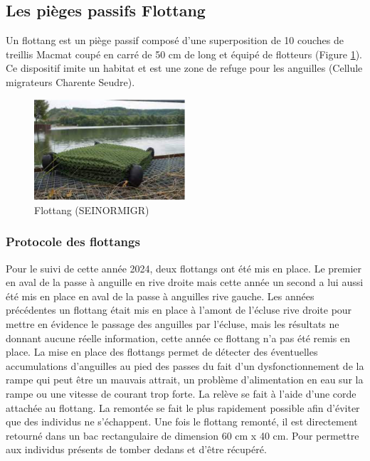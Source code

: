 \documentclass[11pt,titlepage,twoside]{article}\usepackage[]{graphicx}\usepackage[table]{xcolor}
\begin{document}
\subsection{Les pièges passifs \og Flottang \fg{}}

Un flottang est un piège passif composé d’une superposition de 10 couches de treillis Macmat coupé en carré de 50 cm de long et équipé de flotteurs (Figure \ref{Flottang}). Ce dispositif imite un habitat et est une zone de refuge pour les anguilles (Cellule migrateurs Charente Seudre).

\begin{figure}[htpb]
\centering
\includegraphics[width=0.5\textwidth]{Flottang}
\caption{Flottang (SEINORMIGR)}
\label{Flottang}
\end{figure}

\subsubsection{Protocole des flottangs}

Pour le suivi de cette année 2024, deux flottangs ont été mis en place. Le premier en aval de la passe à anguille en rive droite mais cette année un second a lui aussi été mis en place en aval de la passe à anguilles rive gauche. Les années précédentes un flottang était mis en place à l’amont de l’écluse rive droite pour mettre en évidence le passage des anguilles par l’écluse, mais les résultats ne donnant aucune réelle information, cette année ce flottang n’a pas été remis en place. La mise en place des flottangs permet de détecter des éventuelles accumulations d’anguilles au pied des passes du fait d’un dysfonctionnement de la rampe qui peut être un mauvais attrait, un problème d’alimentation en eau sur la rampe ou une vitesse de courant trop forte. La relève se fait à l’aide d’une corde attachée au flottang. La remontée se fait le plus rapidement possible afin d’éviter que des individus ne s’échappent. Une fois le flottang remonté, il est directement retourné dans un bac rectangulaire de dimension 60 cm x 40 cm. Pour permettre aux individus présents de tomber dedans et d’être récupéré. 
\end{document}
